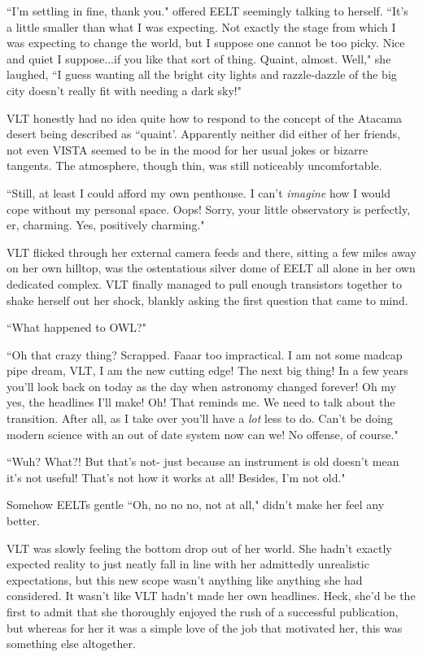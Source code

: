 \documentclass[12pt]{iopart}
\begin{document}
``I'm settling in fine, thank you." offered EELT seemingly talking to herself. ``It's a little smaller than what I was expecting. Not exactly the stage from which I was expecting to change the world, but I suppose one cannot be too picky. Nice and quiet I suppose...if you like that sort of thing. Quaint, almost. Well," she laughed, ``I guess wanting all the bright city lights and razzle-dazzle of the big city doesn't really fit with needing a dark sky!"

VLT honestly had no idea quite how to respond to the concept of the Atacama desert being described as ``quaint'. Apparently neither did either of her friends, not even VISTA seemed to be in the mood for her usual jokes or bizarre tangents. The atmosphere, though thin, was still noticeably uncomfortable.

``Still, at least I could afford my own penthouse. I can't \emph{imagine} how I would cope without my personal space. Oops! Sorry, your little observatory is perfectly, er, charming. Yes, positively charming."

VLT flicked through her external camera feeds and there, sitting a few miles away on her own hilltop, was the ostentatious silver dome of EELT all alone in her own dedicated complex. VLT finally managed to pull enough transistors together to shake herself out her shock, blankly asking the first question that came to mind.

``What happened to OWL?"

``Oh that crazy thing? Scrapped. Faaar too impractical. I am not some madcap pipe dream, VLT, I am the new cutting edge! The next big thing! In a few years you'll look back on today as the day when astronomy changed forever! Oh my yes, the headlines I'll make! Oh! That reminds me. We need to talk about the transition. After all, as I take over you'll have a \emph{lot} less to do. Can't be doing modern science with an out of date system now can we! No offense, of course."

``Wuh? What?! But that's not- just because an instrument is old doesn't mean it's not useful! That's not how it works at all! Besides, I'm not old."

Somehow EELTs gentle ``Oh, no no no, not at all," didn't make her feel any better.

VLT was slowly feeling the bottom drop out of her world. She hadn't exactly expected reality to just neatly fall in line with her admittedly unrealistic expectations, but this new scope wasn't anything like anything she had considered. It wasn't like VLT hadn't made her own headlines. Heck, she'd be the first to admit that she thoroughly enjoyed the rush of a successful publication, but whereas for her it was a simple love of the job that motivated her, this was something else altogether.
\end{document}
